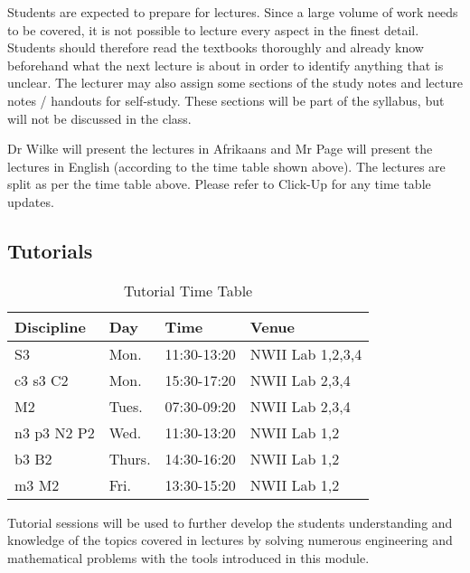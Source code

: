         Students are expected to prepare for lectures. Since a large volume of work
        needs to be covered, it is not possible to lecture every aspect in the
        finest detail. Students should therefore read the textbooks thoroughly
        and already know beforehand what the next lecture is about in order to
        identify anything that is unclear. The lecturer may also assign some
        sections of the study notes and lecture notes / handouts for self-study.
        These sections will be part of the syllabus, but will not be discussed
        in the class.

        Dr Wilke will present the lectures in Afrikaans and Mr Page will present
        the lectures in English (according to the time table shown above). The
        lectures are split as per the time table above. Please refer to Click-Up
        for any time table updates.

    \subsection{Tutorials}
        \begin{table}[!h]
            \begin{center}
             \begin{tabular}{|l|l|l|l|}
                 \hline
                 {\bf Discipline} & {\bf Day} & {\bf Time} & {\bf Venue} \\
                 \hline
                 S3          & Mon.   & 11:30-13:20 & NWII Lab 1,2,3,4 \\
                 c3 s3 C2    & Mon.   & 15:30-17:20 & NWII Lab 2,3,4 \\
                 M2          & Tues.  & 07:30-09:20 & NWII Lab 2,3,4 \\
                 n3 p3 N2 P2 & Wed.   & 11:30-13:20 & NWII Lab 1,2 \\
                 b3 B2       & Thurs. & 14:30-16:20 & NWII Lab 1,2 \\
                 m3 M2       & Fri.   & 13:30-15:20 & NWII Lab 1,2 \\
                 \hline
             \end{tabular}
             \caption{Tutorial Time Table}
            \end{center}
        \end{table}

        Tutorial sessions will be used to further develop the students
        understanding and knowledge of the topics covered in lectures by
        solving numerous engineering and mathematical problems with the
        tools introduced in this module.

